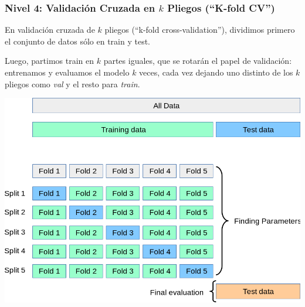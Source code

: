 \documentclass[aspectratio=169,12pt]{beamer}
\begin{document}

\begin{frame}
\frametitle{Nivel 4: Validación Cruzada en $k$ Pliegos (``K-fold CV'')}


En validación cruzada de $k$ pliegos (``k-fold cross-validation''), dividimos primero el conjunto de datos sólo en
train y test. 

Luego, partimos train en $k$ partes iguales, que se rotarán el papel de validaci\'on: entrenamos y
evaluamos el modelo $k$ veces, cada vez dejando uno distinto de los $k$ pliegos como \emph{val} y el resto para \emph{train}.

\begin{center}
\includegraphics[scale=0.2]{clase10-grid_search_cross_validation.png}
\end{center}


\end{frame}
\end{document}
